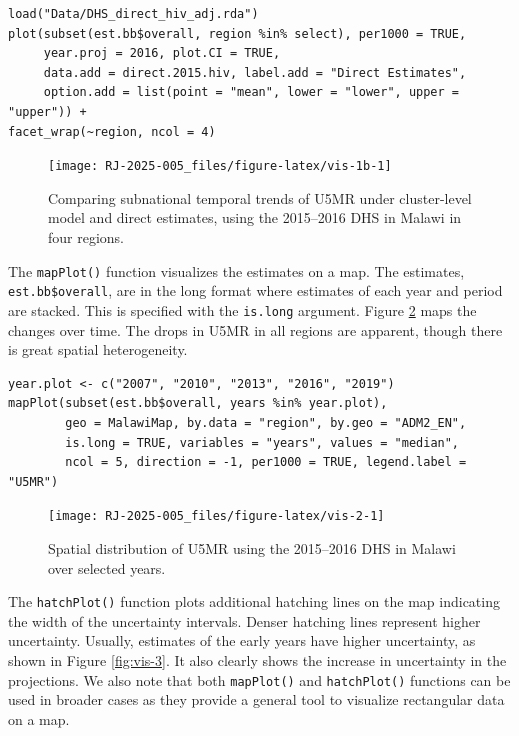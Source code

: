 \begin{verbatim}
load("Data/DHS_direct_hiv_adj.rda")
plot(subset(est.bb$overall, region %in% select), per1000 = TRUE, 
     year.proj = 2016, plot.CI = TRUE,
     data.add = direct.2015.hiv, label.add = "Direct Estimates", 
     option.add = list(point = "mean", lower = "lower", upper = "upper")) + 
facet_wrap(~region, ncol = 4)
\end{verbatim}

\begin{figure}[!ht]

{\centering \texttt{[image: RJ-2025-005\_files/figure-latex/vis-1b-1]} 

}

\caption{Comparing subnational temporal trends of U5MR under cluster-level model and direct estimates, using the 2015--2016 DHS in Malawi in four regions.}\label{fig:vis-1b}
\end{figure}

The \texttt{mapPlot()} function visualizes the estimates on a map. The estimates, \texttt{est.bb\$overall}, are in the long format where estimates of each year and period are stacked. This is specified with the \texttt{is.long} argument. Figure \ref{fig:vis-2} maps the changes over time. The drops in U5MR in all regions are apparent, though there is great spatial heterogeneity.

\begin{verbatim}
year.plot <- c("2007", "2010", "2013", "2016", "2019")
mapPlot(subset(est.bb$overall, years %in% year.plot), 
        geo = MalawiMap, by.data = "region", by.geo = "ADM2_EN", 
        is.long = TRUE, variables = "years", values = "median", 
        ncol = 5, direction = -1, per1000 = TRUE, legend.label = "U5MR")
\end{verbatim}

\begin{figure}[!ht]
\texttt{[image: RJ-2025-005\_files/figure-latex/vis-2-1]} \caption{Spatial distribution of U5MR using the 2015--2016 DHS in Malawi over selected years.}\label{fig:vis-2}
\end{figure}

The \texttt{hatchPlot()} function plots additional hatching lines on the map indicating the width of the uncertainty intervals. Denser hatching lines represent higher uncertainty. Usually, estimates of the early years have higher uncertainty, as shown in Figure \ref{fig:vis-3}. It also clearly shows the increase in uncertainty in the projections. We also note that both \texttt{mapPlot()} and \texttt{hatchPlot()} functions can be used in broader cases as they provide a general tool to visualize rectangular data on a map.

